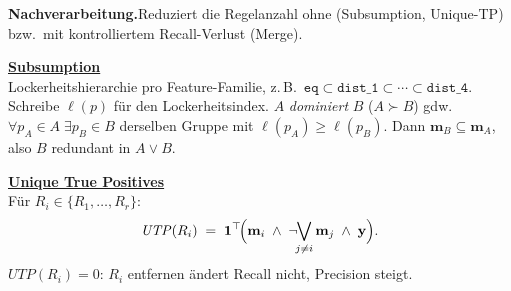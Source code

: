 \documentclass[aspectratio=169,10pt]{beamer}
\newcommand{\m}{\mathbf{m}}
\newcommand{\y}{\mathbf{y}}
\begin{document}
{\begin{frame}[t]
\medskip

\textbf{Nachverarbeitung.}\quad Reduziert die Regelanzahl ohne (Subsumption, Unique-TP) bzw.\ mit kontrolliertem Recall-Verlust (Merge).

\smallskip

\begin{minipage}[t]{0.48\textwidth}
\underline{\textbf{Subsumption}}\\[1pt]
Lockerheitshierarchie pro Feature-Familie, z.\,B.\ $\texttt{eq} \subset \texttt{dist\_1} \subset \cdots \subset \texttt{dist\_4}$. Schreibe $\ell(p)$ f\"ur den Lockerheitsindex.
$A$ \emph{dominiert} $B$ ($A \succ B$) gdw.\ $\forall p_A \!\in\! A\;\exists p_B \!\in\! B$ derselben Gruppe mit
$\ell(p_A) \geq \ell(p_B)$. Dann $\m_B \subseteq \m_A$, also $B$ redundant in $A \lor B$.
\end{minipage}\hfill
\begin{minipage}[t]{0.48\textwidth}
\underline{\textbf{Unique True Positives}}\\[1pt]
F\"ur $R_i \in \{R_1,\dots,R_r\}$:
\[
\mathit{UTP}(R_i) \;=\; \mathbf{1}^\top\!\Bigl(\m_i \;\wedge\; \neg\!\!\bigvee_{j \neq i}\m_j \;\wedge\; \y\Bigr).
\]
$\mathit{UTP}(R_i) = 0$: $R_i$ entfernen \"andert Recall nicht, Precision steigt.
\end{minipage}

\end{frame}
}
\end{document}
